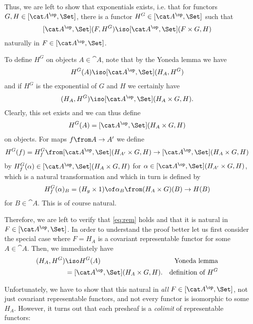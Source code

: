 \documentclass{article}
\theoremstyle{definition}
\numberwithin{equation}{section}
\begin{document}
Thus, we are left to show that exponentials exists, i.e. that for functors $G,H\in[\cat A^\op,\Set]$, there is a functor $H^G\in[\cat A^\op,\Set]$ such that
\begin{align}
  \label{eq:rem}
  [\cat A^\op,\Set](F,H^G)\iso [\cat A^\op,\Set](F\times G,H)
\end{align}
naturally in $F\in[\cat A^\op,\Set]$.

To define $H^G$ on objects $A\in\cat A$, note that by the Yoneda lemma we have
\begin{align*}
  H^G(A)\iso [\cat A^\op,\Set](H_A,H^G)
\end{align*}
and if $H^G$ is the exponential of $G$ and $H$ we certainly have
\begin{align*}
  [\cat A^\op,\Set](H_A,H^G)\iso [\cat A^\op,\Set](H_A\times G,H).
\end{align*}
Clearly, this set exists and we can thus define
\begin{align*}
  H^G(A)=[\cat A^\op,\Set](H_A\times G,H)
\end{align*}
on objects.
For maps $f\from A\to A'$ we define 
\begin{align*}
  H^G(f)=H^G_f\from [\cat A^\op,\Set](H_{A'}\times G,H)\to[\cat A^\op,\Set](H_A\times G,H)
\end{align*}
 by
$H^G_f(\alpha)\in[\cat A^\op,\Set](H_A\times G,H)$ for $\alpha\in [\cat A^\op,\Set](H_{A'}\times G,H)$, which is a natural transformation and which in turn is defined by
\begin{align*}
  H^G_f(\alpha)_B = (H_g\times 1)\of \alpha_B\from (H_{A}\times G)(B)\to H(B)
\end{align*}
for $B\in\cat A$. This is of course natural.

Therefore, we are left to verify that \eqref{eq:rem} holds and that it is natural in $F\in[\cat A^\op,\Set]$.
In order to understand the proof better let us first consider the special case where $F=H_A$ is a covariant representable functor for some $A\in\cat A$. Then, we immediately have
\begin{align*}
  [\cat A^\op,\Set](H_A,H^G)&\iso H^G(A)&\text{Yoneda lemma}\\
  &=[\cat A^\op,\Set](H_A\times G,H).&\text{definition of }H^G
\end{align*}

Unfortunately, we have to show that this natural in \emph{all} $F\in[\cat A^\op,\Set]$, not just covariant representable functors, and not every functor is isomorphic to some $H_A$. However, it turns out that each presheaf is a \emph{colimit} of representable functors:
\end{document}
